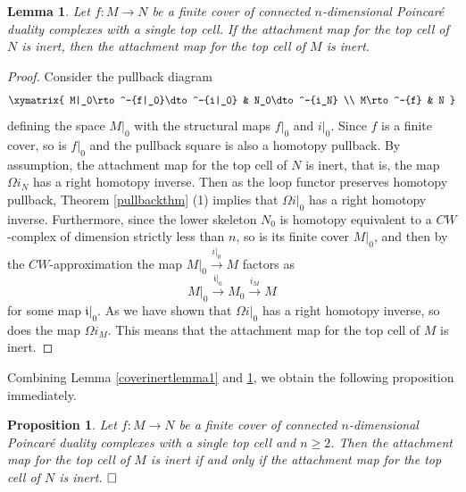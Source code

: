\documentclass[a4]{amsart}
\newtheorem{proposition}[theorem]{Proposition}
\newtheorem{lemma}[theorem]{Lemma}
\theoremstyle{definition}
\newcommand{\qqed}{\hfill\Box}
\begin{document}
\begin{sloppypar}
\begin{lemma}\label{coverinertlemma2}
Let $f: M\stackrel{}{\longrightarrow} N$ be a finite cover of connected $n$-dimensional Poincar\'{e} duality complexes with a single top cell. 
If the attachment map for the top cell of $N$ is inert, then the attachment map for the top cell of $M$ is inert.
\end{lemma}
\begin{proof}
Consider the pullback diagram 
\[\xymatrix{ 
M|_0\rto^-{f|_0}\dto^-{i|_0} & N_0\dto^-{i_N} \\ 
      M\rto^-{f} & N
}\]
defining the space $M|_0$ with the structural maps $f|_0$ and $i|_0$. Since $f$ is a finite cover, so is $f|_0$ and the pullback square is also a homotopy pullback. By assumption, the attachment map for the top cell of $N$ is inert, that is, the map $\Omega i_N$ has a right homotopy inverse. Then as the loop functor preserves homotopy pullback, Theorem \ref{pullbackthm} (1) implies that $\Omega i|_0$ has a right homotopy inverse. 
Furthermore, since the lower skeleton $N_0$ is homotopy equivalent to a $CW$-complex of dimension strictly less than $n$, so is its finite cover $M|_0$, and then by the $CW$-approximation the map $M|_0\stackrel{i|_0}{\longrightarrow} M$ factors as 
\[
M|_0\stackrel{\mathfrak{i}|_0}{\longrightarrow} M_0\stackrel{i_M}{\longrightarrow} M
\]
for some map $\mathfrak{i}|_0$. As we have shown that $\Omega i|_0$ has a right homotopy inverse, so does the map $\Omega i_M$. This means that the attachment map for the top cell of $M$ is inert.
\end{proof}

Combining Lemma \ref{coverinertlemma1} and \ref{coverinertlemma2}, we obtain the following proposition immediately.
\begin{proposition}\label{coverprop}
Let $f: M\stackrel{}{\longrightarrow} N$ be a finite cover of connected $n$-dimensional Poincar\'{e} duality complexes with a single top cell and $n\geq 2$. 
Then the attachment map for the top cell of $M$ is inert if and only if the attachment map for the top cell of $N$ is inert.       $\qqed$
\end{proposition}


\newpage





\end{sloppypar}
\end{document}
